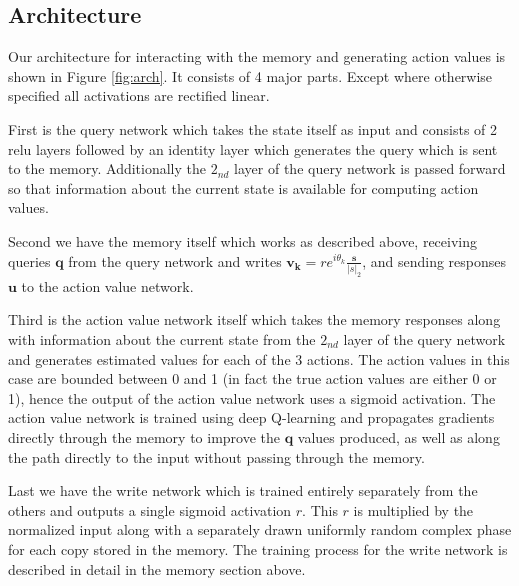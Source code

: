 \documentclass{article}
\begin{document}
\subsection*{Architecture}
Our architecture for interacting with the memory and generating action values is shown in Figure \ref{fig:arch}. It consists of 4 major parts. Except where otherwise specified all activations are rectified linear.

First is the query network which takes the state itself as input and consists of 2 relu layers followed by an identity layer which generates the query which is sent to the memory. Additionally the $2_{nd}$ layer of the query network is passed forward so that information about the current state is available for computing action values. 

Second we have the memory itself which works as described above, receiving queries $\pmb{q}$ from the query network and writes $\pmb{v_k}=re^{i\theta_k}\frac{\pmb{s}}{|s|_2}$, and sending responses $\pmb{u}$ to the action value network.

Third is the action value network itself which takes the memory responses along with information about the current state from the $2_{nd}$ layer of the query network and generates estimated values for each of the 3 actions. The action values in this case are bounded between 0 and 1 (in fact the true action values are either 0 or 1), hence the output of the action value network uses a sigmoid activation. The action value network is trained using deep Q-learning and propagates gradients directly through the memory to improve the $\pmb{q}$ values produced, as well as along the path directly to the input without passing through the memory.

Last we have the write network which is trained entirely separately from the others and outputs a single sigmoid activation $r$. This $r$ is multiplied by the normalized input along with a separately drawn uniformly random complex phase for each copy stored in the memory. The training process for the write network is described in detail in the memory section above.
\end{document}
